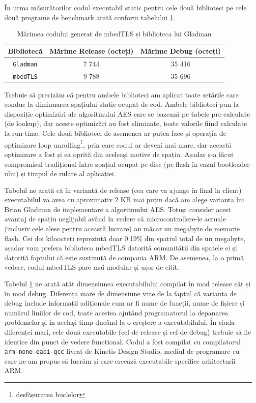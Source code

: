 \documentclass[12pt,a4paper,titlepage]{report}
\begin{document}
În urma măsurătorilor codul executabil static pentru cele două biblioteci pe cele două programe de benchmark arată conform tabelului \ref{aesSizeTable}.

\begin{table}[h]
    \begin{tabular}{ | c | c | c |}
        \hline
        \textbf{Bibliotecă} & \textbf{Mărime Release (octeți)} & \textbf{Mărime Debug (octeți)} \\ \hline
        \texttt{Gladman} & 7 744 & 35 416 \\ \hline
        \texttt{mbedTLS} & 9 788 & 35 696 \\ \hline
    \end{tabular}
    \centering
    \caption{Mărimea codului generat de mbedTLS și biblioteca lui Gladman}
    \label{aesSizeTable}
\end{table}

Trebuie să precizăm că pentru ambele biblioteci am aplicat toate setările care conduc la diminuarea spațiului static ocupat de cod. Ambele biblioteci pun la dispoziție optimizări ale algoritmului AES care se bazează pe tabele pre-calculate (de lookup), dar aceste optimizări au fost eliminate, toate valorile fiind calculate la run-time. Cele două biblioteci de asemenea ar putea face și operația de optimizare loop unrolling\footnote{desfășurarea buclelor}, prin care codul ar deveni mai mare, dar această optimizare a fost și ea oprită din aceleași motive de spațiu. Așadar s-a făcut compromisul tradițional între spațiul ocupat pe disc (pe flash în cazul bootloader-ului) și timpul de rulare al aplicației.

Tabelul ne arată că în variantă de release (cea care va ajunge în final la client) executabilul va avea cu aproximativ 2 KB mai puțin dacă am alege varianta lui Brian Gladman de implementare a algoritmului AES. Totuși consider acest avantaj de spațiu neglijabil având în vedere că microcontrollere-le actuale (inclusiv cele alese pentru această lucrare) au măcar un megabyte de memorie flash. Cei doi kiloocteți reprezintă doar 0.19\% din spațiul total de un megabyte, așadar vom prefera biblioteca mbedTLS datorită comunității din spatele ei și datorită faptului că este susținută de compania ARM. De asemenea, la o primă vedere, codul mbedTLS pare mai modular și ușor de citit.

Tabelul \ref{aesSizeTable} ne arată atât dimensiunea executabilului compilat în mod release cât și în mod debug. Diferența mare de dimensiune vine de la faptul că varianta de debug include informații adiționale cum ar fi nume de funcții, nume de fișiere și numărul liniilor de cod, toate acestea ajutând programatorul la depanarea problemelor și în același timp ducând la o creștere a executabilului. În ciuda diferenței mari, cele două executabile (cel de release și cel de debug) trebuie să fie identice din punct de vedere funcțional. Codul a fost compilat cu compilatorul \texttt{arm-none-eabi-gcc} livrat de Kinetis Design Studio, mediul de programare cu care ne-am propus să lucrăm și care creează executabile specifice arhitecturii ARM.
\end{document}
